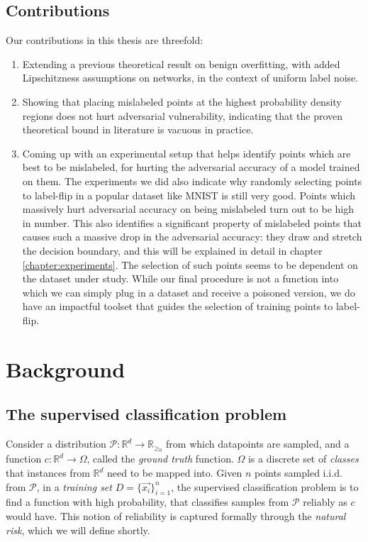 \documentclass[12pt, oneside]{book}
\begin{document}
\section{Contributions}
Our contributions in this thesis are threefold:
\begin{enumerate}
    \item Extending a previous theoretical result on benign overfitting, with
    added Lipschitzness assumptions on networks, in the context of uniform label
    noise.
    \item Showing that placing mislabeled points at the highest probability
    density regions does not hurt adversarial vulnerability, indicating that the
    proven theoretical bound in literature is vacuous in practice.
    \item Coming up with an experimental setup that helps identify points which
    are best to be mislabeled, for hurting the adversarial accuracy of a model
    trained on them. The experiments we did also indicate why randomly selecting
    points to label-flip in a popular dataset like MNIST is still very good.
    Points which massively hurt adversarial accuracy on being mislabeled turn
    out to be high in number. This also identifies a significant property of
    mislabeled points that causes such a massive drop in the adversarial
    accuracy: they draw and stretch the decision boundary, and this will be
    explained in detail in chapter \ref{chapter:experiments}. The selection of
    such points seems to be dependent on the dataset under study. While our
    final procedure is not a function into which we can simply plug in a dataset
    and receive a poisoned version, we do have an impactful toolset that guides
    the selection of training points to label-flip.
\end{enumerate}


\chapter{Background}
\section{The supervised classification problem}

Consider a distribution $\mathcal{P}: \mathbb{R}^d \to \mathbb{R}_{\geq_0}$ from
which datapoints are sampled, and a function $c: \mathbb{R}^d \to \Omega$,
called the \emph{ground truth} function. $\Omega$ is a discrete set of
\emph{classes} that instances from $\mathbb{R}^d$ need to be mapped into. Given
$n$ points sampled i.i.d. from $\mathcal{P}$, in a \emph{training set}
$D=\{\vec{x_i}\}_{i=1}^{n}$, the supervised classification problem is to find a
function with high probability, that classifies samples from $\mathcal{P}$
reliably as $c$ would have. This notion of reliability is captured formally
through the \emph{natural risk}, which we will define shortly.
\end{document}
